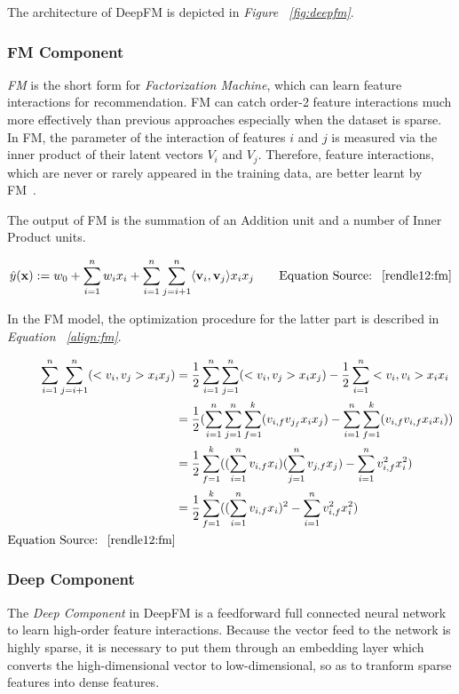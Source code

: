 \documentclass{article}
\begin{document}
    The architecture of DeepFM is depicted in \emph{Figure ~\ref{fig:deepfm}}. 

    \subsubsection{FM Component}
    \label{sec:fm}
    \emph{FM} is the short form for \emph{Factorization Machine}, which can learn feature interactions for recommendation. FM can catch order-2 feature interactions much more effectively than previous approaches especially when the dataset is sparse. In FM, the parameter of the interaction of features $i$ and $j$ is measured via the inner product of their latent vectors $V_i$ and $V_j$. Therefore, feature interactions, which are never or rarely appeared in the training data, are better learnt by FM~\cite{guo17:deepfm}. 

    The output of FM is the summation of an Addition unit and a number of Inner Product units.

    \begin{equation}
    \hat{y}(\mathbf{x}) := w_0 + \sum_{i=1}^{n} w_i x_i + \sum_{i=1}^{n} \sum_{j=i+1}^{n} \langle \mathbf{v}_i, \mathbf{v}_j \rangle x_i x_j \qquad 
    \text{Equation Source: ~\cite{rendle12:fm}}
    \end{equation}

    In the FM model, the optimization procedure for the latter part is described in \emph{Equation ~\ref{align:fm}}.

	\begin{align}
	\label{align:fm}
 	\sum_{i=1}^n \sum_{j=i+1}^n(<v_i,v_j>x_ix_j) &= \frac12 \sum_{i=1}^n \sum_{j=1}^n(<v_i,v_j>x_ix_j) - \frac12 \sum_{i=1}^n<v_i,v_i>x_ix_i\\
 	& =\frac12(\sum_{i=1}^n \sum_{j=1}^n\sum_{f=1}^k(v_{i,f}v_{j_f}x_ix_j)-\sum_{i=1}^n\sum_{f=1}^k(v_{i,f}v_{i,f}x_ix_i)) \\ 
 	& = \frac12\sum_{f=1}^k((\sum_{i=1}^nv_{i,f}x_i)(\sum_{j=1}^nv_{j,f}x_j)-\sum_{i=1}^nv_{i,f}^2x_i^2) \\
 	& = \frac12\sum_{f=1}^k((\sum_{i=1}^nv_{i,f}x_i)^2-\sum_{i=1}^nv_{i,f}^2x_i^2) \\
 	\text{Equation Source: ~\cite{rendle12:fm}}
	\end{align}


    \subsubsection{Deep Component}
    \label{sec:dnn}
    The \emph{Deep Component} in DeepFM is a feedforward full connected neural network to learn high-order feature interactions. Because the vector feed to the network is highly sparse, it is necessary to put them through an embedding layer which converts the high-dimensional vector to low-dimensional, so as to tranform sparse features into dense features. 
\end{document}
